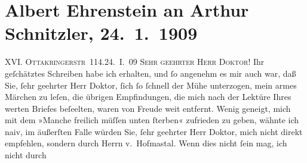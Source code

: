 

         
         \renewcommand{\erwaehntePersonen}{Personen: Camill Hoffmann, Hugo von Hofmannsthal}
         \renewcommand{\erwaehnteInstitutionen}{Institutionen: Erdgeist, Neue Freie Presse}
         \renewcommand{\erwaehnteOrte}{Orte: Ottakringerstraße, Wien}
         \renewcommand{\erwaehnteWerke}{Werke: Die Zeit, Manche freilich, Tai-Gin}
               \section[Albert Ehrenstein an Arthur Schnitzler, 24. 1. 1909]{ Albert Ehrenstein an Arthur Schnitzler, 24. 1. 1909}\nopagebreak{}\rehead{ }\begin{ledgroupsized}[t]{13cm}\normalsize\beginnumbering \toendnotes[C]{\smallbreak\pagebreak[2]} 
\toendnotes[C]{\smallbreak}\pstart
           {\pb}XVI. \textsc{Ottakringerstr} 114.\hfill 24. I. 09\pend
           \pstart{}\textsc{Sehr geehrter Herr Doktor!}\pend\pstart
           Ihr geſchätztes Schreiben habe ich erhalten, und ſo angenehm es mir auch war, daß
               Sie, ſehr geehrter Herr Doktor, ſich ſo ſchnell der Mühe unterzogen, mein armes Märchen zu leſen, die übrigen
               Empfindungen, die mich nach der Lektüre Ihres werten Briefes beſeelten, waren von
               Freude weit entfernt. Wenig geneigt, mich mit dem »Manche freilich müſſen unten ſterben« zufrieden zu geben,
               wähnte ich naiv, im äußerſten Falle würden Sie, ſehr geehrter Herr Doktor, mich nicht
               direkt empfehlen, sondern durch Herrn v. Hofma{\geminationn}stal. Wenn dies nicht ſein mag, ich nicht durch

\end{ledgroupsized}
